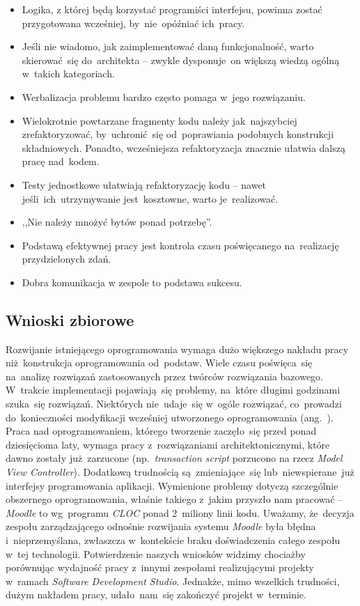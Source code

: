 \begin{description}
\begin{itemize}
\item Logika, z której będą korzystać programiści interfejsu, powinna zostać przygotowana wcześniej, by~nie~opóźniać ich~pracy.
\item Jeśli nie wiadomo, jak zaimplementować daną funkcjonalność, warto skierować~się do~architekta -- zwykle dysponuje~on większą wiedzą ogólną w~takich kategoriach.
\item Werbalizacja problemu bardzo często pomaga w~jego rozwiązaniu.
\item Wielokrotnie powtarzane fragmenty kodu należy jak~najszybciej zrefaktoryzować, by~uchronić~się od~poprawiania podobnych konstrukcji składniowych. Ponadto, wcześniejsza refaktoryzacja znacznie ułatwia dalszą pracę nad~kodem.
\item Testy jednostkowe ułatwiają refaktoryzację kodu -- nawet jeśli~ich~utrzymywanie jest~kosztowne, warto je~realizować.
\item ,,Nie należy mnożyć bytów ponad potrzebę''.
\item Podstawą efektywnej pracy jest kontrola czasu poświęcanego na~realizację przydzielonych zdań.
\item Dobra komunikacja w zespole to podstawa sukcesu.
\end{itemize}
\end{description}

\subsection{Wnioski zbiorowe}
\label{Chapter822}

Rozwijanie istniejącego oprogramowania wymaga dużo większego nakładu pracy niż~konstrukcja oprogramowania od~podstaw. Wiele czasu poświęca~się na~analizę rozwiązań zastosowanych przez twórców rozwiązania bazowego. W~trakcie implementacji pojawiają~się problemy, na~które długimi godzinami szuka~się rozwiązań. Niektórych nie~udaje~się w~ogóle rozwiązać, co~prowadzi do~konieczności modyfikacji wcześniej utworzonego oprogramowania (ang.~). Praca nad oprogramowaniem, którego tworzenie zaczęło~się przed ponad dziesięcioma laty, wymaga pracy z~rozwiązaniami architektonicznymi, które dawno zostały już~zarzucone (np.~\textit{transaction script} porzucono na rzecz \textit{Model View Controller}). Dodatkową trudnością są~zmieniające~się lub~niewspierane~już interfejsy programowania aplikacji. Wymienione problemy dotyczą szczególnie obszernego oprogramowania, właśnie takiego z~jakim przyszło nam pracować -- \textit{Moodle} to wg~programu \textit{CLOC} ponad 2~miliony linii kodu. Uważamy, że~decyzja zespołu zarządzającego odnośnie rozwijania systemu \textit{Moodle} była błędna i~nieprzemyślana, zwłaszcza w~kontekście braku doświadczenia całego zespołu w~tej technologii. Potwierdzenie naszych wniosków widzimy chociażby porównując wydajność pracy z~innymi zespołami realizującymi projekty w~ramach \textit{Software Development Studio}. Jednakże, mimo wszelkich trudności, dużym nakładem pracy, udało~nam~się zakończyć projekt w~terminie. \\

